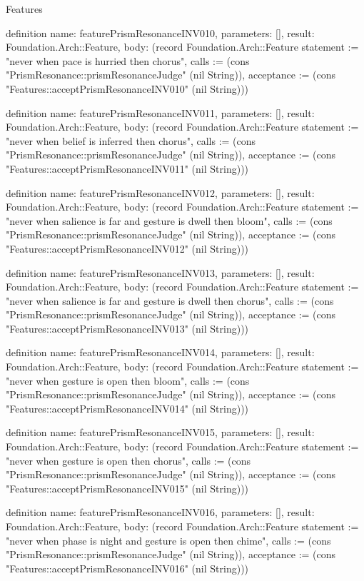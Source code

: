 \begin{lexlean}{Features}
\begin{semanticmodule}
definition{
  name: featurePrismResonanceINV010,
  parameters: [],
  result: Foundation.Arch::Feature,
  body: (record Foundation.Arch::Feature {statement := "never when pace is hurried then chorus", calls := (cons "PrismResonance::prismResonanceJudge" (nil String)), acceptance := (cons "Features::acceptPrismResonanceINV010" (nil String))})
}

definition{
  name: featurePrismResonanceINV011,
  parameters: [],
  result: Foundation.Arch::Feature,
  body: (record Foundation.Arch::Feature {statement := "never when belief is inferred then chorus", calls := (cons "PrismResonance::prismResonanceJudge" (nil String)), acceptance := (cons "Features::acceptPrismResonanceINV011" (nil String))})
}

definition{
  name: featurePrismResonanceINV012,
  parameters: [],
  result: Foundation.Arch::Feature,
  body: (record Foundation.Arch::Feature {statement := "never when salience is far and gesture is dwell then bloom", calls := (cons "PrismResonance::prismResonanceJudge" (nil String)), acceptance := (cons "Features::acceptPrismResonanceINV012" (nil String))})
}

definition{
  name: featurePrismResonanceINV013,
  parameters: [],
  result: Foundation.Arch::Feature,
  body: (record Foundation.Arch::Feature {statement := "never when salience is far and gesture is dwell then chorus", calls := (cons "PrismResonance::prismResonanceJudge" (nil String)), acceptance := (cons "Features::acceptPrismResonanceINV013" (nil String))})
}

definition{
  name: featurePrismResonanceINV014,
  parameters: [],
  result: Foundation.Arch::Feature,
  body: (record Foundation.Arch::Feature {statement := "never when gesture is open then bloom", calls := (cons "PrismResonance::prismResonanceJudge" (nil String)), acceptance := (cons "Features::acceptPrismResonanceINV014" (nil String))})
}

definition{
  name: featurePrismResonanceINV015,
  parameters: [],
  result: Foundation.Arch::Feature,
  body: (record Foundation.Arch::Feature {statement := "never when gesture is open then chorus", calls := (cons "PrismResonance::prismResonanceJudge" (nil String)), acceptance := (cons "Features::acceptPrismResonanceINV015" (nil String))})
}

definition{
  name: featurePrismResonanceINV016,
  parameters: [],
  result: Foundation.Arch::Feature,
  body: (record Foundation.Arch::Feature {statement := "never when phase is night and gesture is open then chime", calls := (cons "PrismResonance::prismResonanceJudge" (nil String)), acceptance := (cons "Features::acceptPrismResonanceINV016" (nil String))})
}


\end{semanticmodule}
\end{lexlean}

